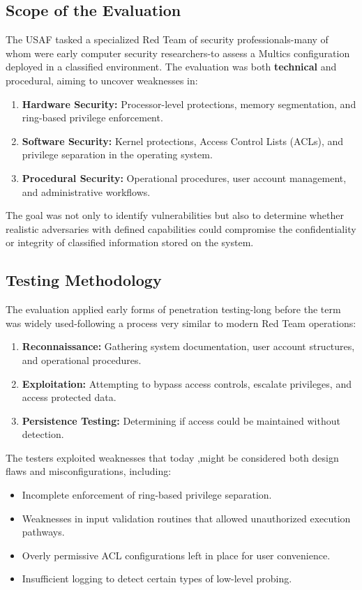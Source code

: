 \subsection{Scope of the Evaluation}
The USAF tasked a specialized Red Team of security professionals-many of whom were early computer security researchers-to assess a Multics configuration deployed in a classified environment. The evaluation was both \textbf{technical} and procedural, aiming to uncover weaknesses in:
\begin{enumerate}
    \item \textbf{Hardware Security:} Processor-level protections, memory segmentation, and ring-based privilege enforcement.
    \item \textbf{Software Security:} Kernel protections, Access Control Lists (ACLs), and privilege separation in the operating system.
    \item \textbf{Procedural Security:} Operational procedures, user account management, and administrative workflows.
\end{enumerate}

The goal was not only to identify vulnerabilities but also to determine whether realistic adversaries with defined capabilities could compromise the confidentiality or integrity of classified information stored on the system.

\subsection{Testing Methodology}
The evaluation applied early forms of penetration testing-long before the term was widely used-following a process very similar to modern Red Team operations:
\begin{enumerate}
    \item \textbf{Reconnaissance:} Gathering system documentation, user account structures, and operational procedures.
    \item \textbf{Exploitation:} Attempting to bypass access controls, escalate privileges, and access protected data.
    \item \textbf{Persistence Testing:} Determining if access could be maintained without detection.
\end{enumerate}

The testers exploited weaknesses that today ,might be considered both design flaws and misconfigurations, including:
\begin{itemize}
    \item Incomplete enforcement of ring-based privilege separation.
    \item Weaknesses in input validation routines that allowed unauthorized execution pathways.
    \item Overly permissive ACL configurations left in place for user convenience.
    \item Insufficient logging to detect certain types of low-level probing.
\end{itemize}

